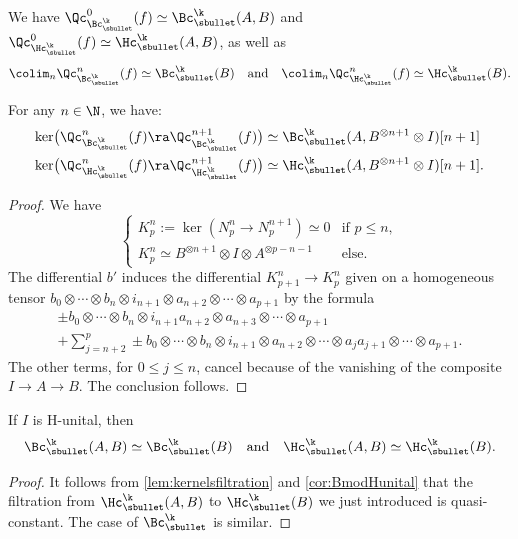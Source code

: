 We have $\Qc^0_{\Bc_\sbullet^\k}(f) \simeq \Bc_\sbullet^\k(A,B)$ and $\Qc_{\Hc_\sbullet^\k}^0(f) \simeq \Hc_\sbullet^\k(A,B)$, as well as
\[
\colim_n \Qc_{\Bc_\sbullet^\k}^n(f) \simeq \Bc_\sbullet^\k(B) \quad \text{and}
\quad \colim_n \Qc_{\Hc_\sbullet^\k}^n(f) \simeq \Hc_\sbullet^\k(B).
\]

\begin{lem}\label{lem:kernelsfiltration}
For any $n \in \N$, we have:
\begin{align*}
\ker\bigl(\Qc^n_{\Bc_\sbullet^\k}(f) \ra \Qc^{n+1}_{\Bc_\sbullet^\k}(f)\bigr) &\simeq \Bc_\sbullet^\k(A, B^{\otimes n+1} \otimes I)[n+1]\\
\ker\bigl(\Qc^n_{\Hc_\sbullet^\k}(f) \ra \Qc^{n+1}_{\Hc_\sbullet^\k}(f)\bigr) &\simeq \Hc_\sbullet^\k(A, B^{\otimes n+1} \otimes I)[n+1].
\end{align*}
\end{lem}

\begin{proof}
We have
\[
\begin{cases}
K_p^n := \ker(N^n_p \to N^{n+1}_p) \simeq 0&\text{if }p \leq n,\\ K_p^n\simeq B^{\otimes n+1} \otimes I \otimes A^{\otimes p-n-1}& \text{else}.
\end{cases}
\]
The differential $b'$ induces the differential $K_{p+1}^n \to K_p^n$ given on a homogeneous tensor $b_0\otimes \cdots \otimes b_{n} \otimes i_{n+1} \otimes a_{n+2}\otimes \cdots \otimes a_{p+1}$ by the formula
\begin{multline*}
\pm b_0\otimes \cdots \otimes b_{n} \otimes i_{n+1} a_{n+2}\otimes a_{n+3} \otimes \cdots \otimes a_{p+1} \\+
\sum_{j=n+2}^{p} \pm b_0\otimes \cdots \otimes b_{n} \otimes i_{n+1} \otimes a_{n+2}\otimes \cdots \otimes a_ja_{j+1} \otimes \cdots \otimes a_{p+1}.
\end{multline*}
The other terms, for $0 \leq j \leq n$, cancel because of the vanishing of the composite $I \to A \to B$. The conclusion follows.
\end{proof}

\begin{cor}\label{cor:HAHB}
If $I$ is H-unital, then
\[
\Bc_\sbullet^\k(A,B) \simeq \Bc_\sbullet^\k(B) \quad \text{and} \quad \Hc_\sbullet^\k(A,B) \simeq \Hc_\sbullet^\k(B).
\]
\end{cor}

\begin{proof}
It follows from \autoref{lem:kernelsfiltration} and \autoref{cor:BmodHunital} that the filtration from $\Hc_\sbullet^\k(A,B)$ to $\Hc_\sbullet^\k(B)$ we just introduced is quasi-constant. The case of $\Bc_\sbullet^\k$ is similar.
\end{proof}

